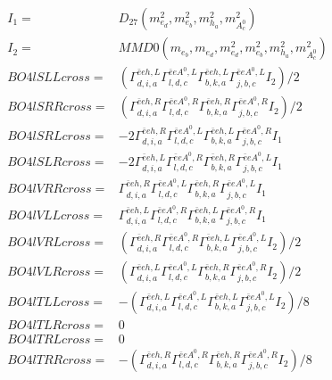 \documentclass[A4,landscape]{article}
\begin{document}
\begin{align} 
I_1 = & D_{27}(m^2_{e_{{d}}}, m^2_{e_{{b}}}, m^2_{h_{{a}}}, m^2_{A^0_{{c}}}) \\ 
I_2 = & MMD0(m_{e_{{b}}}, m_{e_{{d}}}, m^2_{e_{{d}}}, m^2_{e_{{b}}}, m^2_{h_{{a}}}, m^2_{A^0_{{c}}}) \\ 
  BO4lSLLcross= & ( \Gamma^{\bar{e}e h ,L}_{d, i, a} \Gamma^{\bar{e}e A^0 ,L}_{l, d, c} \Gamma^{\bar{e}e h ,L}_{b, k, a} \Gamma^{\bar{e}e A^0 ,L}_{j, b, c} I_2)/2 \\ 
  BO4lSRRcross= & ( \Gamma^{\bar{e}e h ,R}_{d, i, a} \Gamma^{\bar{e}e A^0 ,R}_{l, d, c} \Gamma^{\bar{e}e h ,R}_{b, k, a} \Gamma^{\bar{e}e A^0 ,R}_{j, b, c} I_2)/2 \\ 
  BO4lSRLcross= & -2  \Gamma^{\bar{e}e h ,R}_{d, i, a} \Gamma^{\bar{e}e A^0 ,L}_{l, d, c} \Gamma^{\bar{e}e h ,L}_{b, k, a} \Gamma^{\bar{e}e A^0 ,R}_{j, b, c} I_1 \\ 
  BO4lSLRcross= & -2  \Gamma^{\bar{e}e h ,L}_{d, i, a} \Gamma^{\bar{e}e A^0 ,R}_{l, d, c} \Gamma^{\bar{e}e h ,R}_{b, k, a} \Gamma^{\bar{e}e A^0 ,L}_{j, b, c} I_1 \\ 
  BO4lVRRcross= &  \Gamma^{\bar{e}e h ,R}_{d, i, a} \Gamma^{\bar{e}e A^0 ,L}_{l, d, c} \Gamma^{\bar{e}e h ,R}_{b, k, a} \Gamma^{\bar{e}e A^0 ,L}_{j, b, c} I_1 \\ 
  BO4lVLLcross= &  \Gamma^{\bar{e}e h ,L}_{d, i, a} \Gamma^{\bar{e}e A^0 ,R}_{l, d, c} \Gamma^{\bar{e}e h ,L}_{b, k, a} \Gamma^{\bar{e}e A^0 ,R}_{j, b, c} I_1 \\ 
  BO4lVRLcross= & ( \Gamma^{\bar{e}e h ,R}_{d, i, a} \Gamma^{\bar{e}e A^0 ,R}_{l, d, c} \Gamma^{\bar{e}e h ,L}_{b, k, a} \Gamma^{\bar{e}e A^0 ,L}_{j, b, c} I_2)/2 \\ 
  BO4lVLRcross= & ( \Gamma^{\bar{e}e h ,L}_{d, i, a} \Gamma^{\bar{e}e A^0 ,L}_{l, d, c} \Gamma^{\bar{e}e h ,R}_{b, k, a} \Gamma^{\bar{e}e A^0 ,R}_{j, b, c} I_2)/2 \\ 
  BO4lTLLcross= & -( \Gamma^{\bar{e}e h ,L}_{d, i, a} \Gamma^{\bar{e}e A^0 ,L}_{l, d, c} \Gamma^{\bar{e}e h ,L}_{b, k, a} \Gamma^{\bar{e}e A^0 ,L}_{j, b, c} I_2)/8 \\ 
  BO4lTLRcross= & 0 \\ 
  BO4lTRLcross= & 0 \\ 
  BO4lTRRcross= & -( \Gamma^{\bar{e}e h ,R}_{d, i, a} \Gamma^{\bar{e}e A^0 ,R}_{l, d, c} \Gamma^{\bar{e}e h ,R}_{b, k, a} \Gamma^{\bar{e}e A^0 ,R}_{j, b, c} I_2)/8 \\ 
\end{align} 
\end{document}
